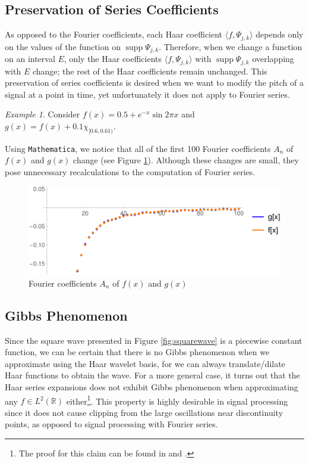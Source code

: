 \documentclass[11pt]{amsart}
\theoremstyle{theorem} %
\theoremstyle{definition}
\theoremstyle{example}
\theoremstyle{remark}
\newtheorem{exmp}[thm]{Example}
\numberwithin{equation}{section}
\newcommand{\R}{\mathbb{R}}
\DeclareMathOperator*{\supp}{supp}
\begin{document}
\subsection{Preservation of Series Coefficients} As opposed to the Fourier coefficients, each Haar coefficient $ \langle f,\varPsi_{j,k} \rangle $ depends only on the values of the function on $ \supp \varPsi_{j,k} $. Therefore, when we change a function on an interval $ E $, only the Haar coefficients $ \langle f,\varPsi_{j,k} \rangle $ with $ \supp \varPsi_{j,k} $ overlapping with $ E $ change; the rest of the Haar coefficients remain unchanged. This preservation of series coefficients is desired when we want to modify the pitch of a signal at a point in time, yet unfortunately it does not apply to Fourier series.

\begin{exmp}
	Consider $ f(x) = 0.5 + e^{-x} \sin{2\pi x} $ and $ g(x) = f(x) + 0.1 \chi_{[0.6,0.61)} $.
\end{exmp}

Using \verb|Mathematica|, we notice that all of the first 100 Fourier coefficients $ A_n $ of $ f(x) $ and $ g(x) $ change (see Figure \ref{fig:fouriercoeff}). Although these changes are small, they pose unnecessary recalculations to the computation of Fourier series.
\begin{figure}[h]
	\centering
	\includegraphics[width=0.76\linewidth]{img/fourier_coeff3}
	\caption{Fourier coefficients $ A_n $ of $ f(x) $ and $ g(x) $}
	\label{fig:fouriercoeff}
\end{figure}

\subsection{Gibbs Phenomenon}
Since the square wave presented in Figure \ref{fig:squarewave} is a piecewise constant function, we can be certain that there is no Gibbs phenomenon when we approximate using the Haar wavelet basis, for we can always translate/dilate Haar functions to obtain the wave. For a more general case, it turns out that the Haar series expansions does not exhibit Gibbs phenomenon when approximating any $ f \in L^2(\R) $ either\footnote{The proof for this claim can be found in \cite[Chap. 5]{raeen} and \cite{kelly}.}. This property is highly desirable in signal processing since it does not cause clipping from the large oscillations near discontinuity points, as opposed to signal processing with Fourier series.

\printbibliography
\end{document}

